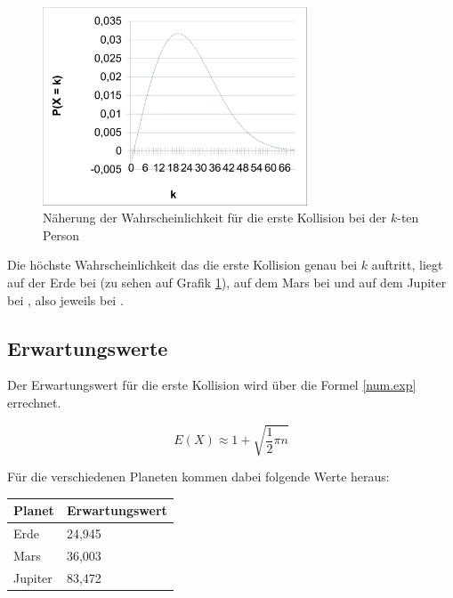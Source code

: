 \documentclass[../main.tex]{subfiles}
\begin{document}
    \begin{figure}[h]
        \begin{center}
            \includegraphics[width=0.7\textwidth]{../graphics/peq.png}
        \end{center}
        \caption{\label{num.fpeqe} Näherung der Wahrscheinlichkeit für die erste Kollision bei der $k$-ten Person}
    \end{figure}



    Die höchste Wahrscheinlichkeit das die erste Kollision genau bei $k$ auftritt, liegt auf der Erde bei  (zu sehen auf Grafik \ref{num.fpeqe}), auf dem Mars bei  und auf dem Jupiter bei , also jeweils bei .

    \subsection{Erwartungswerte}

    Der Erwartungswert für die erste Kollision wird über die Formel \ref{num.exp} errechnet.

    \begin{equation}
        E(X) \approx 1 + \sqrt{\frac{1}{2} \pi n}
        \label{num.exp}
    \end{equation}

    Für die verschiedenen Planeten kommen dabei folgende Werte heraus:

    \begin{center}
        \begin{tabular}{|l|l|}
            \hline
            \textbf{Planet} & \textbf{Erwartungswert} \\ \hline
            Erde            & 24,945                  \\ \hline
            Mars            & 36,003                  \\ \hline
            Jupiter         & 83,472                  \\ \hline
        \end{tabular}
    \end{center}
\end{document}
